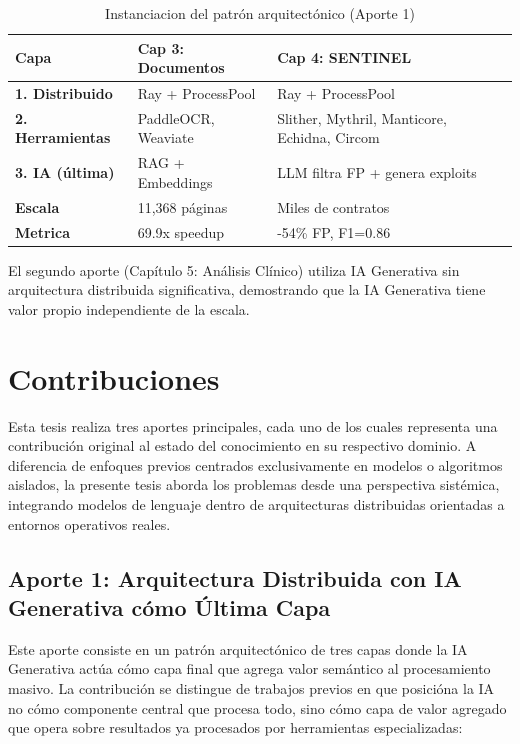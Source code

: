 \documentclass[12pt,a4paper,twoside]{book}
\begin{document}
\begin{table}[h]
\centering
\caption{Instanciacion del patrón arquitectónico (Aporte 1)}
\label{tab:instanciacion_patrón}
\begin{tabular}{p{3.5cm}p{5cm}p{5cm}}
\toprule
\textbf{Capa} & \textbf{Cap 3: Documentos} & \textbf{Cap 4: SENTINEL} \\
\midrule
\textbf{1. Distribuido} & Ray + ProcessPool & Ray + ProcessPool \\
\textbf{2. Herramientas} & PaddleOCR, Weaviate & Slither, Mythril, Manticore, Echidna, Circom \\
\textbf{3. IA (última)} & RAG + Embeddings & LLM filtra FP + genera exploits \\
\midrule
\textbf{Escala} & 11,368 páginas & Miles de contratos \\
\textbf{Metrica} & 69.9x speedup & -54\% FP, F1=0.86 \\
\bottomrule
\end{tabular}
\end{table}

El segundo aporte (Capítulo 5: Análisis Clínico) utiliza IA Generativa sin arquitectura distribuida significativa, demostrando que la IA Generativa tiene valor propio independiente de la escala.

\section{Contribuciones}

Esta tesis realiza tres aportes principales, cada uno de los cuales representa una contribución original al estado del conocimiento en su respectivo dominio. A diferencia de enfoques previos centrados exclusivamente en modelos o algoritmos aislados, la presente tesis aborda los problemas desde una perspectiva sistémica, integrando modelos de lenguaje dentro de arquitecturas distribuidas orientadas a entornos operativos reales.

\subsection{Aporte 1: Arquitectura Distribuida con IA Generativa cómo Última Capa}

Este aporte consiste en un patrón arquitectónico de tres capas donde la IA Generativa actúa cómo capa final que agrega valor semántico al procesamiento masivo. La contribución se distingue de trabajos previos en que posicióna la IA no cómo componente central que procesa todo, sino cómo capa de valor agregado que opera sobre resultados ya procesados por herramientas especializadas:
\end{document}
